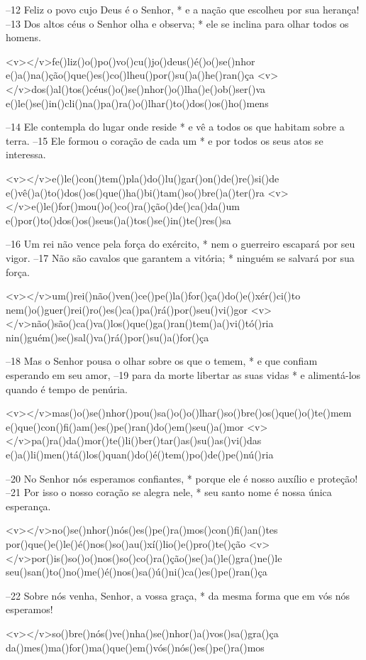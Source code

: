–12 Feliz o povo cujo Deus é o Senhor, *
e a nação que escolheu por sua herança!
–13 Dos altos céus o Senhor olha e observa; *
ele se inclina para olhar todos os homens.

<v></v>fe()liz()o()po()vo()cu()jo()deus()é()o()se()nhor
e()a()na()ção()que()es()co()lheu()por()su()a()he()ran()ça
<v></v>dos()al()tos()céus()o()se()nhor()o()lha()e()ob()ser()va
e()le()se()in()cli()na()pa()ra()o()lhar()to()dos()os()ho()mens

–14 Ele contempla do lugar onde reside *
e vê a todos os que habitam sobre a terra.
–15 Ele formou o coração de cada um *
e por todos os seus atos se interessa.

<v></v>e()le()con()tem()pla()do()lu()gar()on()de()re()si()de
e()vê()a()to()dos()os()que()ha()bi()tam()so()bre()a()ter()ra
<v></v>e()le()for()mou()o()co()ra()ção()de()ca()da()um
e()por()to()dos()os()seus()a()tos()se()in()te()res()sa

–16 Um rei não vence pela força do exército, *
nem o guerreiro escapará por seu vigor.
–17 Não são cavalos que garantem a vitória; *
ninguém se salvará por sua força.

<v></v>um()rei()não()ven()ce()pe()la()for()ça()do()e()xér()ci()to
nem()o()guer()rei()ro()es()ca()pa()rá()por()seu()vi()gor
<v></v>não()são()ca()va()los()que()ga()ran()tem()a()vi()tó()ria
nin()guém()se()sal()va()rá()por()su()a()for()ça

–18 Mas o Senhor pousa o olhar sobre os que o temem, *
e que confiam esperando em seu amor,
–19 para da morte libertar as suas vidas *
e alimentá-los quando é tempo de penúria.

<v></v>mas()o()se()nhor()pou()sa()o()o()lhar()so()bre()os()que()o()te()mem
e()que()con()fi()am()es()pe()ran()do()em()seu()a()mor
<v></v>pa()ra()da()mor()te()li()ber()tar()as()su()as()vi()das
e()a()li()men()tá()los()quan()do()é()tem()po()de()pe()nú()ria

–20 No Senhor nós esperamos confiantes, *
porque ele é nosso auxílio e proteção!
–21 Por isso o nosso coração se alegra nele, *
seu santo nome é nossa única esperança.

<v></v>no()se()nhor()nós()es()pe()ra()mos()con()fi()an()tes
por()que()e()le()é()nos()so()au()xí()lio()e()pro()te()ção
<v></v>por()is()so()o()nos()so()co()ra()ção()se()a()le()gra()ne()le
seu()san()to()no()me()é()nos()sa()ú()ni()ca()es()pe()ran()ça

–22 Sobre nós venha, Senhor, a vossa graça, *
da mesma forma que em vós nós esperamos!

<v></v>so()bre()nós()ve()nha()se()nhor()a()vos()sa()gra()ça
da()mes()ma()for()ma()que()em()vós()nós()es()pe()ra()mos